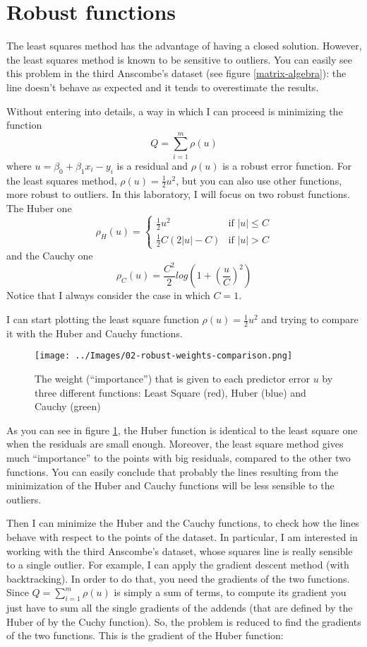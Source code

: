 \section{Robust functions}
    The least squares method has the advantage of having a closed solution. However, the least squares method is known to be sensitive to outliers. You can easily see this problem in the third Anscombe's dataset (see figure \ref{matrix-algebra}): the line doesn't behave as expected and it tends to overestimate the results.\par
    Without entering into details, a way in which I can proceed is minimizing the function
    \[Q = \sum_{i=1}^{m}\rho(u)\]
    where \(u = \beta_0 + \beta_1 x_i - y_i\) is a residual and \(\rho(u)\) is a robust error function. For the least squares method, \(\rho(u) = \frac{1}{2}u^2\), but you can also use other functions, more robust to outliers. In this laboratory, I will focus on two robust functions. The Huber one
    \[
        \rho_H(u) =
        \begin{cases}
            \frac{1}{2}u^2 &            \text{if } |u| \leq C \\
            \frac{1}{2}C(2|u| - C) &    \text{if } |u| > C
        \end{cases}
    \]
    and the Cauchy one
    \[\rho_C(u) = \frac{C^2}{2}log\left(1 + \left(\frac{u}{C}\right)^2\right)\]
    Notice that I always consider the case in which \(C=1\).\par
    I can start plotting the least square function \(\rho(u) = \frac{1}{2}u^2\) and trying to compare it with the Huber and Cauchy functions.
    \begin{figure}
        \centering
        \texttt{[image: ../Images/02-robust-weights-comparison.png]}
        \caption{The weight (``importance'') that is given to each predictor error \(u\) by three different functions: Least Square (red), Huber (blue) and Cauchy (green)}
        \label{robust-weights-comparison}
    \end{figure}
    As you can see in figure \ref{robust-weights-comparison}, the Huber function is identical to the least square one when the residuals are small enough. Moreover, the least square method gives much ``importance'' to the points with big residuals, compared to the other two functions. You can easily conclude that probably the lines resulting from the minimization of the Huber and Cauchy functions will be less sensible to the outliers.\par
    Then I can minimize the Huber and the Cauchy functions, to check how the lines behave with respect to the points of the dataset. In particular, I am interested in working with the third Anscombe's dataset, whose squares line is really sensible to a single outlier. For example, I can apply the gradient descent method (with backtracking). In order to do that, you need the gradients of the two functions. Since \(Q = \sum_{i=1}^{m}\rho(u)\) is simply a sum of terms, to compute its gradient you just have to sum all the single gradients of the addends (that are defined by the Huber of by the Cuchy function). So, the problem is reduced to find the gradients of the two functions. This is the gradient of the Huber function:
